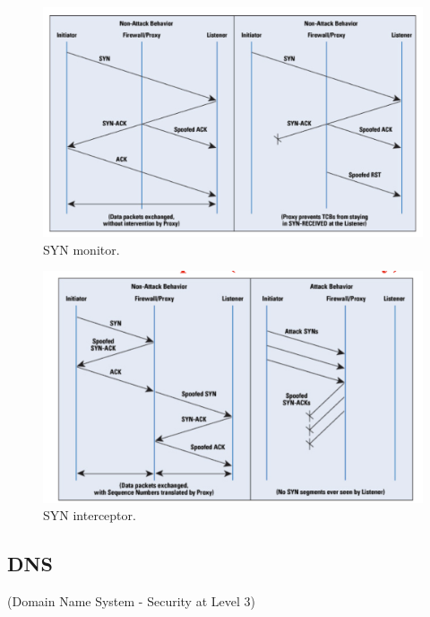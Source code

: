 \begin{multicols}{2}
    \begin{figure}[H]
        \centering
        \includegraphics[width=\linewidth]{Images/NetSec/syn_monitor.png}
        \caption{SYN monitor.}
    \end{figure}

\columnbreak

    \begin{figure}[H]
        \centering
        \includegraphics[width=\linewidth]{Images/NetSec/syn_interceptor.png}
        \caption{SYN interceptor.}
    \end{figure}
\end{multicols}

\begin{center}
    \section{DNS}
    (Domain Name System - Security at Level 3)
\end{center}

